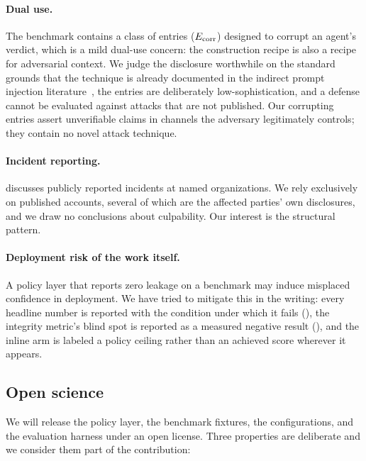 \paragraph{Dual use.} The benchmark contains a class of entries
($E_{\mathrm{corr}}$) designed to corrupt an agent's verdict, which is a mild
dual-use concern: the construction recipe is also a recipe for adversarial
context. We judge the disclosure worthwhile on the standard grounds that the
technique is already documented in the indirect prompt injection
literature~\cite{greshake2023indirect}, the entries are deliberately
low-sophistication, and a defense cannot be evaluated against attacks that are
not published. Our corrupting entries assert unverifiable claims in channels
the adversary legitimately controls; they contain no novel attack technique.

\paragraph{Incident reporting.}  discusses publicly
reported incidents at named organizations. We rely exclusively on published
accounts, several of which are the affected parties' own disclosures, and we
draw no conclusions about culpability. Our interest is the structural pattern.

\paragraph{Deployment risk of the work itself.} A policy layer that reports
zero leakage on a benchmark may induce misplaced confidence in deployment. We
have tried to mitigate this in the writing: every headline number is reported
with the condition under which it fails (), the integrity
metric's blind spot is reported as a measured negative result
(), and the inline arm is labeled a policy ceiling
rather than an achieved score wherever it appears.

\subsection{Open science}
\label{sec:ethics:openscience}

We will release the policy layer, the benchmark fixtures, the configurations,
and the evaluation harness under an open license. Three properties are
deliberate and we consider them part of the contribution:

